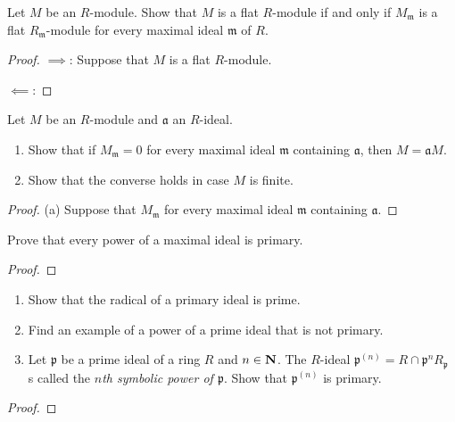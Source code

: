 \newpage
\begin{problem}
Let $M$ be an $R$-module. Show that $M$ is a flat $R$-module if
and only if $M_{\mathfrak{m}}$ is a flat
$R_{\mathfrak{m}}$-module for every maximal ideal $\mathfrak{m}$
of $R$.
\end{problem}
\begin{proof}
$\implies$: Suppose that $M$ is a flat $R$-module.

$\impliedby$:
\end{proof}
\newpage
\begin{problem}
Let $M$ be an $R$-module and $\mathfrak{a}$ an $R$-ideal.
\begin{enumerate}[noitemsep,label=(\alph*)]
\item Show that if $M_{\mathfrak{m}}=0$ for every maximal ideal
  $\mathfrak{m}$ containing $\mathfrak{a}$, then $M=\mathfrak{a}M$.
\item Show that the converse holds in case $M$ is finite.
\end{enumerate}
\end{problem}
\begin{proof}
(a) Suppose that $M_{\mathfrak{m}}$ for every maximal ideal
$\mathfrak{m}$ containing $\mathfrak{a}$.
\end{proof}
\newpage
\begin{problem}
Prove that every power of a maximal ideal is primary.
\end{problem}
\begin{proof}
\end{proof}
\newpage
\begin{problem}
\begin{enumerate}[noitemsep,label=(\alph*)]
\item Show that the radical of a primary ideal is prime.
\item Find an example of a power of a prime ideal that is not
  primary.
\item Let $\mathfrak{p}$ be a prime ideal of a ring $R$ and
  $n\in\mathbf{N}$. The $R$-ideal
  $\mathfrak{p}^{(n)}=R\cap\mathfrak{p}^nR_{\mathfrak{p}}$ s
  called the \emph{$n$th symbolic power of $\mathfrak{p}$}. Show
  that $\mathfrak{p}^{(n)}$ is primary.
\end{enumerate}
\end{problem}
\begin{proof}
\end{proof}

